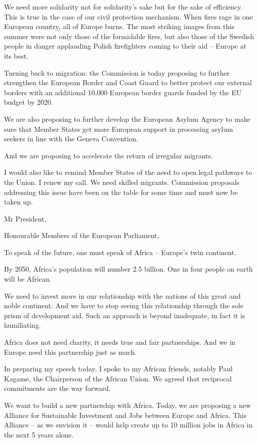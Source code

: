 \documentclass[a4paper,11pt]{article}
\begin{document}
We need more solidarity not for solidarity's sake but for the sake of efficiency. This is true in the case of our civil protection mechanism. When fires rage in one European country, all of Europe burns. The most striking images from this summer were not only those of the formidable fires, but also those of the Swedish people in danger applauding Polish firefighters coming to their aid – Europe at its best.

Turning back to migration: the Commission is today proposing to further strengthen the European Border and Coast Guard to better protect our external borders with an additional 10,000 European border guards funded by the EU budget by 2020.

We are also proposing to further develop the European Asylum Agency to make sure that Member States get more European support in processing asylum seekers in line with the Geneva Convention.

And we are proposing to accelerate the return of irregular migrants.

I would also like to remind Member States of the need to open legal pathways to the Union. I renew my call. We need skilled migrants. Commission proposals addressing this issue have been on the table for some time and must now be taken up.

 

Mr President,

Honourable Members of the European Parliament,

To speak of the future, one must speak of Africa – Europe's twin continent. 

By 2050, Africa's population will number 2.5 billion. One in four people on earth will be African.

We need to invest more in our relationship with the nations of this great and noble continent. And we have to stop seeing this relationship through the sole prism of development aid. Such an approach is beyond inadequate, in fact it is humiliating.

Africa does not need charity, it needs true and fair partnerships. And we in Europe need this partnership just as much.

In preparing my speech today, I spoke to my African friends, notably Paul Kagame, the Chairperson of the African Union. We agreed that reciprocal commitments are the way forward.

We want to build a new partnership with Africa. Today, we are proposing a new Alliance for Sustainable Investment and Jobs between Europe and Africa. This Alliance – as we envision it – would help create up to 10 million jobs in Africa in the next 5 years alone.
\end{document}
